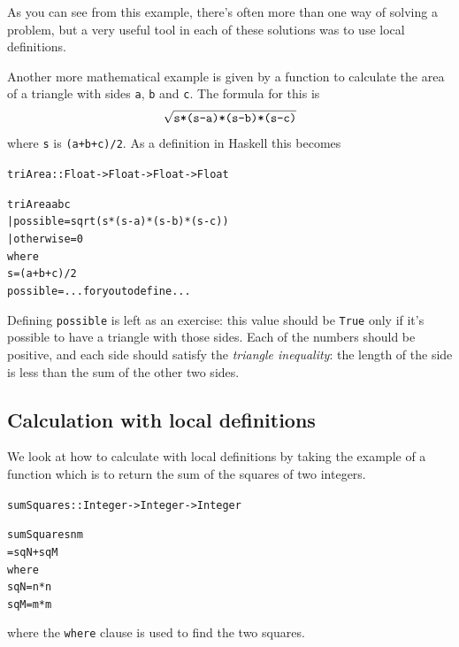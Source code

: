 As you can see from this example, there's often more than one way of solving a problem, but a very useful tool in each of these solutions was to use local definitions.

Another more mathematical example is given by a function to calculate the area of a triangle with sides \texttt{a}, \texttt{b} and \texttt{c}. The formula for this is \[\sqrt{\mbox{\texttt{s*(s-a)*(s-b)*(s-c)}}}\]
where \texttt{s} is \texttt{(a+b+c)/2}. As a definition in Haskell this becomes
\begin{alltt}
triArea :: Float -> Float -> Float -> Float

triArea a b c 
    | possible   = sqrt(s*(s-a)*(s-b)*(s-c))
    | otherwise  = 0
    where
      s = (a+b+c)/2 
      possible = ... for you to define ...
\end{alltt}
Defining \texttt{possible} is left as an exercise: this value should be \texttt{True} only if it's possible to have a triangle with those sides. Each of the numbers should be positive, and each side should satisfy the \emph{triangle inequality}: the length of the side is less than the sum of the other two sides.


\begin{figure}[t]
\end{figure}

\subsection*{Calculation with local definitions}

We  look at how to calculate with local definitions by taking the example of 
a function which is to
return the sum of the squares of two integers.  
\begin{alltt}
sumSquares :: Integer -> Integer -> Integer

sumSquares n m 
  = sqN + sqM
    where
    sqN = n*n
    sqM = m*m
\end{alltt}
where the \texttt{where} clause is used to find the two squares.

